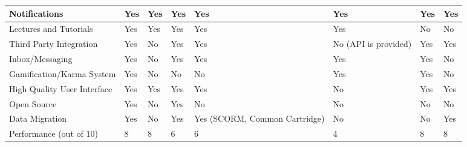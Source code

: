 \begin{table}[ht]
{\begin{tabular}{llllllll}
        \multicolumn{1}{|l|}{Notifications}               & \multicolumn{1}{l|}{Yes} & \multicolumn{1}{l|}{Yes} & \multicolumn{1}{l|}{Yes} & \multicolumn{1}{l|}{Yes} & \multicolumn{1}{l|}{Yes}                       & \multicolumn{1}{l|}{Yes} & \multicolumn{1}{l|}{Yes} \\ \hline
        \multicolumn{1}{|l|}{Lectures and Tutorials}      & \multicolumn{1}{l|}{Yes} & \multicolumn{1}{l|}{Yes} & \multicolumn{1}{l|}{Yes} & \multicolumn{1}{l|}{Yes} & \multicolumn{1}{l|}{Yes}                       & \multicolumn{1}{l|}{No} & \multicolumn{1}{l|}{No} \\ \hline
        \multicolumn{1}{|l|}{Third Party Integration}     & \multicolumn{1}{l|}{Yes} & \multicolumn{1}{l|}{No} & \multicolumn{1}{l|}{Yes} & \multicolumn{1}{l|}{Yes} & \multicolumn{1}{l|}{No (API is provided)}      & \multicolumn{1}{l|}{Yes} & \multicolumn{1}{l|}{Yes} \\ \hline
        \multicolumn{1}{|l|}{Inbox/Messaging}             & \multicolumn{1}{l|}{Yes} & \multicolumn{1}{l|}{No} & \multicolumn{1}{l|}{Yes} & \multicolumn{1}{l|}{Yes} & \multicolumn{1}{l|}{Yes}                       & \multicolumn{1}{l|}{Yes} & \multicolumn{1}{l|}{No} \\ \hline
        \multicolumn{1}{|l|}{Gamification/Karma System}   & \multicolumn{1}{l|}{Yes} & \multicolumn{1}{l|}{No} & \multicolumn{1}{l|}{No} & \multicolumn{1}{l|}{No} & \multicolumn{1}{l|}{Yes}                       & \multicolumn{1}{l|}{Yes} & \multicolumn{1}{l|}{No} \\ \hline
        \multicolumn{1}{|l|}{High Quality User Interface} & \multicolumn{1}{l|}{Yes} & \multicolumn{1}{l|}{Yes} & \multicolumn{1}{l|}{Yes} & \multicolumn{1}{l|}{Yes} & \multicolumn{1}{l|}{No}                        & \multicolumn{1}{l|}{Yes} & \multicolumn{1}{l|}{Yes} \\ \hline
        \multicolumn{1}{|l|}{Open Source}                 & \multicolumn{1}{l|}{Yes} & \multicolumn{1}{l|}{No} & \multicolumn{1}{l|}{Yes} & \multicolumn{1}{l|}{No} & \multicolumn{1}{l|}{No}                        & \multicolumn{1}{l|}{No} & \multicolumn{1}{l|}{No} \\ \hline
        \multicolumn{1}{|l|}{Data Migration}              & \multicolumn{1}{l|}{Yes} & \multicolumn{1}{l|}{No} & \multicolumn{1}{l|}{Yes} & \multicolumn{1}{l|}{Yes (SCORM, Common Cartridge)} & \multicolumn{1}{l|}{No}                        & \multicolumn{1}{l|}{No} & \multicolumn{1}{l|}{Yes} \\ \hline
        Performance (out of 10)                           & 8                      & 8                      & 6                      & 6                      & 4                                              & 8                     & 8                      \\ \hline
    \end{tabular}}
\end{table}








